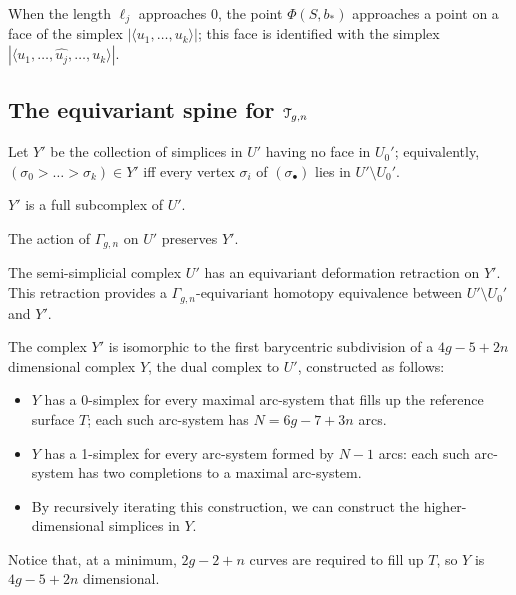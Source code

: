 \begin{remark}
  \label{rem:approaching-face}
  When the length $\ell_j$ approaches $0$, the point $\Phi(S, b_*)$
  approaches a point on a face of the simplex $|\langle u_1, \ldots, u_k\rangle|$; this
  face is identified with the simplex $|\langle u_1, \ldots, \hat{u_j}, \ldots, u_k\rangle|$.
\end{remark}


\subsection{The equivariant spine for $\mathcal{T}_{g,n}$}
\label{sec:spine}

\begin{definition}
  Let $Y'$ be the collection of simplices in $U'$ having no face in
  $U_0'$; equivalently, $(\sigma_0 > \ldots > \sigma_k) \in Y'$ iff every vertex $\sigma_i$
  of $(\sigma_\bullet)$ lies in $U' \setminus U_0'$.
\end{definition}
$Y'$ is a full subcomplex of $U'$.

The action of $\Gamma_{g,n}$ on $U'$ preserves $Y'$.
\begin{theorem}
  \label{thm:spine}
  The semi-simplicial complex $U'$ has an equivariant deformation
  retraction on $Y'$.  This retraction provides a
  $\Gamma_{g,n}$-equivariant homotopy equivalence between $U' \setminus U_0'$ and
  $Y'$.
\end{theorem}

The complex $Y'$ is isomorphic to the first barycentric subdivision of
a $4g - 5 + 2n$ dimensional complex $Y$, the dual complex to $U'$,
constructed as follows:
\begin{itemize}
\item $Y$ has a 0-simplex for every maximal arc-system that fills up the
  reference surface $T$; each such arc-system has $N = 6g - 7 + 3n$ arcs.
\item $Y$ has a 1-simplex for every arc-system formed by $N-1$ arcs:
  each such arc-system has two completions to a maximal arc-system.
\item By recursively iterating this construction, we can construct the
  higher-dimensional simplices in $Y$.
\end{itemize}
Notice that, at a minimum, $2g - 2 +n$ curves are required to fill up
$T$, so $Y$ is $4g - 5 + 2n$ dimensional.



